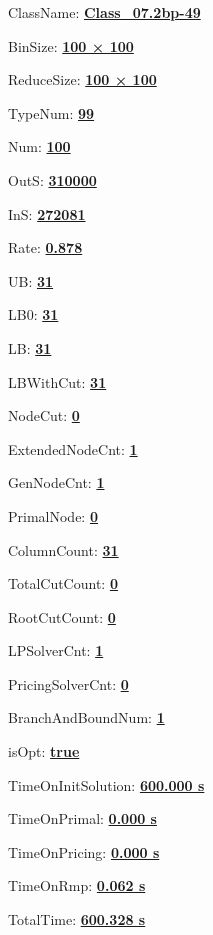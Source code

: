 \documentclass[11pt]{article}
\begin{document}
\pagestyle{empty}


ClassName: \underline{\textbf{Class_07.2bp-49}}
\par
BinSize: \underline{\textbf{100 × 100}}
\par
ReduceSize: \underline{\textbf{100 × 100}}
\par
TypeNum: \underline{\textbf{99}}
\par
Num: \underline{\textbf{100}}
\par
OutS: \underline{\textbf{310000}}
\par
InS: \underline{\textbf{272081}}
\par
Rate: \underline{\textbf{0.878}}
\par
UB: \underline{\textbf{31}}
\par
LB0: \underline{\textbf{31}}
\par
LB: \underline{\textbf{31}}
\par
LBWithCut: \underline{\textbf{31}}
\par
NodeCut: \underline{\textbf{0}}
\par
ExtendedNodeCnt: \underline{\textbf{1}}
\par
GenNodeCnt: \underline{\textbf{1}}
\par
PrimalNode: \underline{\textbf{0}}
\par
ColumnCount: \underline{\textbf{31}}
\par
TotalCutCount: \underline{\textbf{0}}
\par
RootCutCount: \underline{\textbf{0}}
\par
LPSolverCnt: \underline{\textbf{1}}
\par
PricingSolverCnt: \underline{\textbf{0}}
\par
BranchAndBoundNum: \underline{\textbf{1}}
\par
isOpt: \underline{\textbf{true}}
\par
TimeOnInitSolution: \underline{\textbf{600.000 s}}
\par
TimeOnPrimal: \underline{\textbf{0.000 s}}
\par
TimeOnPricing: \underline{\textbf{0.000 s}}
\par
TimeOnRmp: \underline{\textbf{0.062 s}}
\par
TotalTime: \underline{\textbf{600.328 s}}
\par
\newpage


\end{document}
